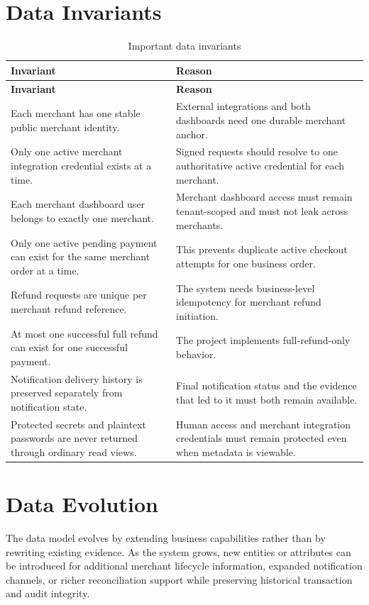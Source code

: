 \section{Data Invariants}

\begin{longtable}{L{0.34\textwidth}L{0.56\textwidth}}
\caption{Important data invariants}\\
\toprule
\textbf{Invariant} & \textbf{Reason} \\
\midrule
\endfirsthead
\toprule
\textbf{Invariant} & \textbf{Reason} \\
\midrule
\endhead
Each merchant has one stable public merchant identity. & External integrations and both dashboards need one durable merchant anchor. \\
\bodyrowrule
Only one active merchant integration credential exists at a time. & Signed requests should resolve to one authoritative active credential for each merchant. \\
\bodyrowrule
Each merchant dashboard user belongs to exactly one merchant. & Merchant dashboard access must remain tenant-scoped and must not leak across merchants. \\
\bodyrowrule
Only one active pending payment can exist for the same merchant order at a time. & This prevents duplicate active checkout attempts for one business order. \\
\bodyrowrule
Refund requests are unique per merchant refund reference. & The system needs business-level idempotency for merchant refund initiation. \\
\bodyrowrule
At most one successful full refund can exist for one successful payment. & The project implements full-refund-only behavior. \\
\bodyrowrule
Notification delivery history is preserved separately from notification state. & Final notification status and the evidence that led to it must both remain available. \\
\bodyrowrule
Protected secrets and plaintext passwords are never returned through ordinary read views. & Human access and merchant integration credentials must remain protected even when metadata is viewable. \\
\bottomrule
\end{longtable}

\section{Data Evolution}

The data model evolves by extending business capabilities rather than by
rewriting existing evidence. As the system grows, new entities or attributes
can be introduced for additional merchant lifecycle information, expanded
notification channels, or richer reconciliation support while preserving
historical transaction and audit integrity.

